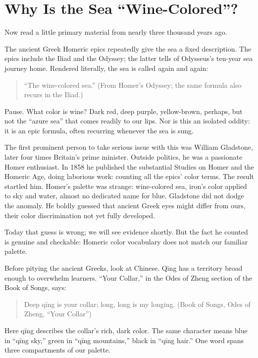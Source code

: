 \section{Why Is the Sea ``Wine-Colored''?}
Now read a little primary material from nearly three thousand years ago.

The ancient Greek Homeric epics repeatedly give the sea a fixed description. The epics include the Iliad and the Odyssey; the latter tells of Odysseus's ten-year sea journey home. Rendered literally, the sea is called again and again:

\begin{quote}
``The wine-colored sea.'' (From Homer's Odyssey; the same formula also recurs in the Iliad.)
\end{quote}
Pause. What color is wine? Dark red, deep purple, yellow-brown, perhaps, but not the ``azure sea'' that comes readily to our lips. Nor is this an isolated oddity: it is an epic formula, often recurring whenever the sea is sung.

The first prominent person to take serious issue with this was William Gladstone, later four times Britain's prime minister. Outside politics, he was a passionate Homer enthusiast. In 1858 he published the substantial Studies on Homer and the Homeric Age, doing laborious work: counting all the epics' color terms. The result startled him. Homer's palette was strange: wine-colored sea, iron's color applied to sky and water, almost no dedicated name for blue. Gladstone did not dodge the anomaly. He boldly guessed that ancient Greek eyes might differ from ours, their color discrimination not yet fully developed.

Today that guess is wrong; we will see evidence shortly. But the fact he counted is genuine and checkable: Homeric color vocabulary does not match our familiar palette.

Before pitying the ancient Greeks, look at Chinese. Qīng has a territory broad enough to overwhelm learners. ``Your Collar,'' in the Odes of Zheng section of the Book of Songs, says:

\begin{quote}
Deep qīng is your collar; long, long is my longing. (Book of Songs, Odes of Zheng, ``Your Collar'')
\end{quote}
Here qīng describes the collar's rich, dark color. The same character means blue in ``qīng sky,'' green in ``qīng mountains,'' black in ``qīng hair.'' One word spans three compartments of our palette.

